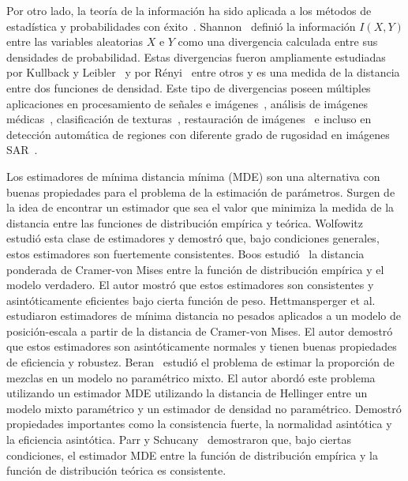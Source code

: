 Por otro lado, la teoría de la información ha sido aplicada a los métodos de estadística y probabilidades con éxito~\cite{Liese2006}. 
Shannon~\cite{Shannon1948} definió la información $I(X,Y)$ entre las variables aleatorias $X$ e $Y$ como una divergencia calculada entre sus densidades de probabilidad. 
Estas divergencias fueron ampliamente estudiadas por Kullback y Leibler~\cite{KullbackLeibler1951} y por Rényi~\cite{renyi1961} entre otros y es una medida de la distancia entre dos funciones de densidad. 
Este tipo de divergencias poseen múltiples aplicaciones en procesamiento de señales e imágenes~\cite{4218961}, análisis de imágenes médicas~\cite{5599869},
clasificación de texturas~\cite{1246862}, restauración de imágenes~\cite{1224731} e incluso en detección automática de regiones con diferente grado de rugosidad en imágenes SAR~\cite{6377288,ClassificationPolSARSegmentsMinimizationWishartDistances}.


Los estimadores de mínima distancia mínima (MDE) son una  alternativa con buenas propiedades para el problema de la estimación de parámetros.
Surgen de la idea de encontrar un estimador que sea el valor que minimiza la medida de la distancia entre las funciones de distribución empírica y teórica.
Wolfowitz~\cite{wolfowitz1953, wolfowitz1957} estudió esta clase de estimadores y demostró que, bajo condiciones generales, estos estimadores son fuertemente consistentes. 
Boos estudió~\cite{Boos1981} la distancia ponderada de Cramer-von Mises entre la función de distribución empírica y el modelo verdadero.
El autor mostró que estos estimadores son consistentes y asintóticamente eficientes bajo cierta función de peso.
Hettmansperger et al.~\cite{HettmanSperger1994} estudiaron estimadores de mínima distancia no pesados aplicados a un modelo de posición-escala a partir de la distancia de Cramer-von Mises. El autor demostró que estos estimadores son asintóticamente normales y tienen buenas propiedades de eficiencia y robustez.
Beran~\cite{beran1977} estudió el problema de estimar la proporción de mezclas en un modelo no paramétrico mixto. El autor abordó este problema utilizando un estimador MDE utilizando la distancia de Hellinger entre un modelo mixto paramétrico y un estimador de densidad no paramétrico. Demostró propiedades importantes como la consistencia fuerte, la normalidad asintótica y la eficiencia asintótica.
Parr y Schucany~\cite{parr1982} demostraron que, bajo ciertas condiciones, el estimador MDE entre la función de distribución empírica y la función de distribución teórica es consistente.

